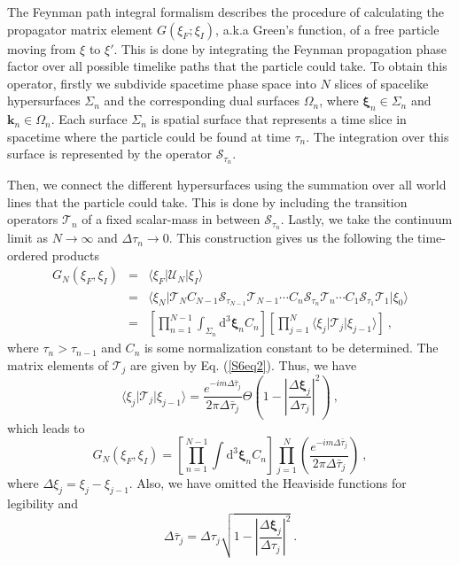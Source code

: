 \documentclass[12pt]{iopart}
\begin{document}
The Feynman path integral formalism describes the procedure of calculating the propagator 
matrix element $G(\xi_F;\xi_I)$, a.k.a Green's function, of a free particle moving from $\xi$ 
to $\xi'$. This is done by integrating the Feynman propagation phase factor over all possible 
timelike paths that the particle could take.  To obtain this operator, firstly we subdivide 
spacetime phase space into $N$ slices of spacelike hypersurfaces $\Sigma_n$ and the 
corresponding dual surfaces $\Omega_n$, where $\boldsymbol{\xi}_n\in\Sigma_n$ 
and $\boldsymbol{k}_n\in\Omega_n$.  Each surface $\Sigma_n$ is spatial surface that 
represents a time slice in spacetime where the particle could be found at time $\tau_n$. 
The integration over this surface is represented by the operator $\mathcal{S}_{\tau_n}$. 

Then, we connect the different hypersurfaces using the summation over all world lines 
that the particle could take. This is done by including the transition operators 
$\mathcal{T}_{n}$ of a fixed scalar-mass in between $\mathcal{S}_{\tau_n}$. 
Lastly, we take the continuum limit as $N \rightarrow \infty$ and $\Delta\tau_n 
\rightarrow 0$. This construction gives us the following the time-ordered products
    \begin{eqnarray}
        G_N(\xi_F,\xi_I) &=& \langle\xi_F\vert\mathcal{U}_N\vert\xi_I\rangle \nonumber\\
        &=& \langle\xi_N
        \vert \mathcal{T}_{N}C_{N-1}\mathcal{S}_{\tau_{N-1}}\mathcal{T}_{{N-1}}
        \cdots C_{n}\mathcal{S}_{\tau_n}\mathcal{T}_{n}\cdots C_1\mathcal{S}_{\tau_1}
        \mathcal{T}_{1}\vert\xi_0\rangle \nonumber\\
        &=& \left[\prod_{n=1}^{N-1}\int_{\Sigma_{n}}\mathrm{d}^3
        \boldsymbol{\xi}_{n}C_n\right]\left[\prod_{j=1}^N\langle\xi_j
        \vert\mathcal{T}_{j}\vert\xi_{j-1}\rangle\right]\ ,
        \label{S6eq4}
    \end{eqnarray}
%
where $\tau_n>\tau_{n-1}$ and $C_n$ is some normalization constant to be determined. The 
matrix elements of $\mathcal{T}_{j}$ are given by Eq. (\ref{S6eq2}). Thus, we have
%
    \begin{equation}
        \langle\xi_j\vert\mathcal{T}_{j}\vert\xi_{j-1}\rangle=\frac{e^{-im\Delta\bar{\tau}_j}}
        {2\pi\Delta\bar{\tau}_j}\Theta\left(1-\left\vert\frac{\Delta\boldsymbol{\xi}_j}{\Delta\tau_j}
        \right\vert^2\right)\ ,
        \label{S6eq5}
    \end{equation}
%
which leads to
%
    \begin{equation}
        G_N(\xi_F,\xi_I)=\left[\prod_{n=1}^{N-1}\int\mathrm{d}^3\boldsymbol{\xi}_{n}C_n\right]
        \prod_{j=1}^N\left(\frac{e^{-im\Delta\bar{\tau}_j}}{2\pi\Delta\bar{\tau}_j}\right)\ ,
        \label{S6eq6}
    \end{equation}
%
where $\Delta\xi_j=\xi_j-\xi_{j-1}$. Also, we have omitted the Heaviside functions for legibility and
%
    \begin{equation}
        \Delta\bar{\tau}_j=\Delta\tau_j\sqrt{1-\left\vert\frac{\Delta\boldsymbol{\xi}_j}{\Delta\tau_j}
        \right\vert^2}\ .
        \label{S6eq7}
    \end{equation}
%
\end{document}
